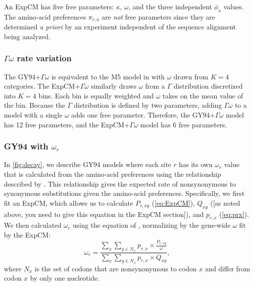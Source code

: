 \documentclass[11pt]{article}
\newcommand\jdbcomment[1]{{\color{red}[#1]}}
\begin{document}
An ExpCM has five free parameters: $\kappa$, $\omega$, and the three independent $\phi_x$ values.
The amino-acid preferences $\pi_{r,a}$ are \emph{not} free parameters since they are determined \textit{a priori} by an experiment independent of the sequence alignment being analyzed.

\subsubsection*{$\Gamma\omega$ rate variation}

The GY94+$\Gamma\omega$ is equivalent to the M5 model in \citet{yang2000codon} with $\omega$ drawn from $K = 4$ categories.
The ExpCM+$\Gamma\omega$ similarly draws $\omega$ from a $\Gamma$ distribution discretized into $K=4$ bins. 
Each bin is equally weighted and $\omega$ takes on the mean value of the bin. 
Because the $\Gamma$ distribution is defined by two parameters, adding $\Gamma\omega$ to a model with a single $\omega$ adds one free parameter.
Therefore, the GY94+$\Gamma\omega$ model has 12 free parameters, and the ExpCM+$\Gamma\omega$ model has 6 free parameters.

\subsubsection*{GY94 with $\omega_r$}
In \ref{fig:decay}, we describe GY94 models where each site $r$ has its own $\omega_r$ value that is calculated from the amino-acid preferences using the relationship described by \citet{spielman2015relationship}.
This relationship gives the expected rate of nonsynonymous to synonymous substitutions given the amino-acid preferences.
Specifically, we first fit an ExpCM, which allows us to calculate $P_{r,xy}$ (\ref{eq:ExpCM}), $Q_{xy}$ (\jdbcomment{as noted above, you need to give this equation in the ExpCM section}), and $p_{r,x}$ (\ref{eq:prx}).
We then calculated $\omega_r$ using the equation of \citet{spielman2015relationship}, normalizing by the gene-wide $\omega$ fit by the ExpCM:
\begin{equation}
\label{eq:w_r}
\omega_{r} = \frac{\sum_{x} \sum_{y \in N_x} {p_{r,x} \times \frac{P_{r,xy}}{\omega}}}{\sum_{x} \sum_{y \in N_x} {p_{r,x} \times Q_{xy}}},
\end{equation}
where $N_x$ is the set of codons that are nonsynonymous to codon $x$ and differ from codon $x$ by only one nucleotide. 
\end{document}
